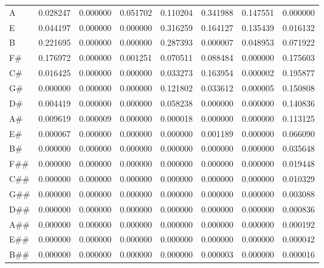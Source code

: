 \begin{tabular}{lrrrrrrr}
A   &  0.028247 &  0.000000 &  0.051702 &  0.110204 &  0.341988 &  0.147551 &  0.000000 \\
E   &  0.044197 &  0.000000 &  0.000000 &  0.316259 &  0.164127 &  0.135439 &  0.016132 \\
B   &  0.221695 &  0.000000 &  0.000000 &  0.287393 &  0.000007 &  0.048953 &  0.071922 \\
F\#  &  0.176972 &  0.000000 &  0.001251 &  0.070511 &  0.088484 &  0.000000 &  0.175603 \\
C\#  &  0.016425 &  0.000000 &  0.000000 &  0.033273 &  0.163954 &  0.000002 &  0.195877 \\
G\#  &  0.000000 &  0.000000 &  0.000000 &  0.121802 &  0.033612 &  0.000005 &  0.150808 \\
D\#  &  0.004419 &  0.000000 &  0.000000 &  0.058238 &  0.000000 &  0.000000 &  0.140836 \\
A\#  &  0.009619 &  0.000009 &  0.000000 &  0.000018 &  0.000000 &  0.000000 &  0.113125 \\
E\#  &  0.000067 &  0.000000 &  0.000000 &  0.000000 &  0.001189 &  0.000000 &  0.066090 \\
B\#  &  0.000000 &  0.000000 &  0.000000 &  0.000000 &  0.000000 &  0.000000 &  0.035648 \\
F\#\# &  0.000000 &  0.000000 &  0.000000 &  0.000000 &  0.000000 &  0.000000 &  0.019448 \\
C\#\# &  0.000000 &  0.000000 &  0.000000 &  0.000000 &  0.000000 &  0.000000 &  0.010329 \\
G\#\# &  0.000000 &  0.000000 &  0.000000 &  0.000000 &  0.000000 &  0.000000 &  0.003088 \\
D\#\# &  0.000000 &  0.000000 &  0.000000 &  0.000000 &  0.000000 &  0.000000 &  0.000836 \\
A\#\# &  0.000000 &  0.000000 &  0.000000 &  0.000000 &  0.000000 &  0.000000 &  0.000192 \\
E\#\# &  0.000000 &  0.000000 &  0.000000 &  0.000000 &  0.000000 &  0.000000 &  0.000042 \\
B\#\# &  0.000000 &  0.000000 &  0.000000 &  0.000000 &  0.000003 &  0.000000 &  0.000016 \\
\bottomrule
\end{tabular}
